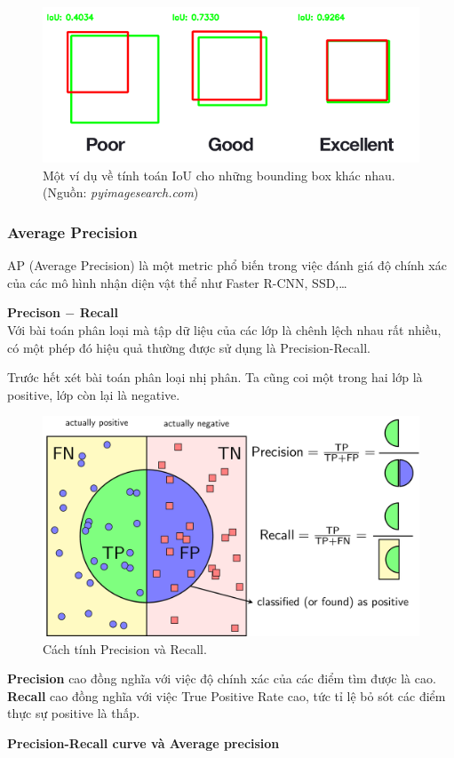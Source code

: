 \documentclass[a4paper, 12pt]{report}
\begin{document}
\begin{figure}[!h]
	\centering
	\includegraphics[width=0.7\linewidth]{Images/iou4}
	\caption{Một ví dụ về tính toán IoU cho những bounding box khác nhau. (Nguồn: \textit{pyimagesearch.com})}
	\label{fig:iou4}
\end{figure}

\subsubsection{Average Precision}
AP (Average Precision) là một metric phổ biến trong việc đánh giá độ chính xác của các mô hình nhận diện vật thể như Faster R-CNN, SSD,\dots\par	
\textbf{Precison $-$ Recall}\\
Với bài toán phân loại mà tập dữ liệu của các lớp là chênh lệch nhau rất nhiều, có một phép đó hiệu quả thường được sử dụng là Precision-Recall.\par
Trước hết xét bài toán phân loại nhị phân. Ta cũng coi một trong hai lớp là positive, lớp còn lại là negative.\par
\begin{figure}[!h]
	\centering
	\includegraphics[width=0.7\linewidth]{Images/PR}
	\caption{Cách tính Precision và Recall.}
	\label{fig:iou2}
\end{figure}
\textbf{Precision} cao đồng nghĩa với việc độ chính xác của các điểm tìm được là cao. \textbf{Recall} cao đồng nghĩa với việc True Positive Rate cao, tức tỉ lệ bỏ sót các điểm thực sự positive là thấp.\par
\textbf{Precision-Recall curve và Average precision}\\
\end{document}
